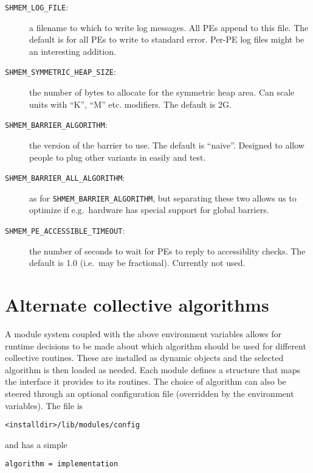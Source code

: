 \begin{description}
\item [{\texttt{SHMEM\_LOG\_FILE}:}] a filename to which to write log
  messages.  All PEs append to this file. The default is for all PEs to
  write to standard error. Per-PE log files might be an interesting
  addition.
\item [{\texttt{SHMEM\_SYMMETRIC\_HEAP\_SIZE}:}] the number of bytes
  to allocate for the symmetric heap area. Can scale units with ``K'',
  ``M'' etc. modifiers. The default is 2G.
\item [{\texttt{SHMEM\_BARRIER\_ALGORITHM}:}] the version of the
  barrier to use. The default is ``naive''. Designed to allow people
  to plug other variants in easily and test.
\item [{\texttt{SHMEM\_BARRIER\_ALL\_ALGORITHM}:}] as for
  \texttt{SHMEM\_BARRIER\_ALGORITHM}, but separating these two allows us
  to optimize if e.g.\ hardware has special support for global barriers.
\item [{\texttt{SHMEM\_PE\_ACCESSIBLE\_TIMEOUT}:}] the number of
  seconds to wait for PEs to reply to accessiblity checks. The default
  is 1.0 (i.e.\ may be fractional).  Currently not used.
\end{description}

\section{Alternate collective algorithms}

A module system coupled with the above environment variables allows
for runtime decisions to be made about which algorithm should be used
for different collective routines.  These are installed as dynamic
objects and the selected algorithm is then loaded as needed.  Each
module defines a structure that maps the interface it provides to its
routines.  The choice of algorithm can also be steered through an
optional configuration file (overridden by the environment variables).
The file is

\begin{minipage}{\linewidth}
\begin{lstlisting}[caption={Configuration File Location}]
<installdir>/lib/modules/config
\end{lstlisting}
\end{minipage}

and has a simple

\begin{minipage}{\linewidth}
\begin{lstlisting}[caption={Configuration File Format}]
algorithm = implementation
\end{lstlisting}
\end{minipage}

